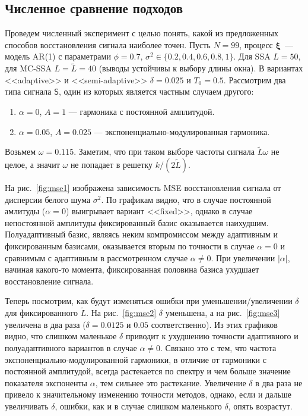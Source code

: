 \documentclass{math-mech-sci}
\begin{document}
\subsection*{Численное сравнение подходов}
Проведем численный эксперимент с целью понять, какой из предложенных способов восстановления сигнала наиболее точен. Пусть $N=99$, процесс $\bm\xi$~--- модель AR(1) с параметрами $\phi=0.7$, $\sigma^2\in\{0.2, 0.4, 0.6, 0.8, 1\}$. Для SSA $L=50$, для MC-SSA $L=\widetilde L=40$ (выводы устойчивы к выбору длины окна). В вариантах <<adaptive>> и <<semi-adaptive>> $\delta=0.025$ и $T_0=0.5$. Рассмотрим два типа сигнала $\mathsf{S}$, один из которых является частным случаем другого:
\begin{enumerate}
    \item $\alpha=0$, $A=1$ --- гармоника с постоянной амплитудой.
    \item $\alpha=0.05$, $A=0.025$ --- экспоненциально-модулированная гармоника.
\end{enumerate}
Возьмем $\omega=0.115$. Заметим, что при таком выборе частоты сигнала $\widetilde L \omega$ не целое, а значит $\omega$ не попадает в решетку $k/(2\widetilde L)$.

На рис.~\ref{fig:mse1} изображена зависимость MSE восстановления сигнала от дисперсии белого шума $\sigma^2$. По графикам видно, что в случае постоянной амлитуды ($\alpha=0$) выигрывает вариант <<fixed>>, однако в случае непостоянной амплитуды фиксированный базис оказывается наихудшим. Полуадаптивный базис, являясь неким компромиссом между адаптивным и фиксированным базисами, оказывается вторым по точности в случае $\alpha=0$ и сравнимым с адаптивным в рассмотренном случае $\alpha\ne0$. При увеличении $|\alpha|$, начиная какого-то момента, фиксированная половина базиса ухудшает восстановление сигнала.

Теперь посмотрим, как будут изменяться ошибки при уменьшении/увеличении $\delta$ для фиксированного $\widetilde L$. На рис.~\ref{fig:mse2} $\delta$ уменьшена, а на рис.~\ref{fig:mse3} увеличена в два раза ($\delta=0.0125$ и $0.05$ соответственно). Из этих графиков видно, что слишком маленькое $\delta$ приводит к ухудшению точности адаптивного и полуадаптивного вариантов в случае $\alpha\ne0$. Связано это с тем, что частота экспоненциально-модулированной гармоники, в отличие от гармоники с постоянной амплитудой, всегда растекается по спектру и чем больше значение показателя экспоненты $\alpha$, тем сильнее это растекание. Увеличение $\delta$ в два раза не привело к значительному изменению точности методов, однако, если и дальше увеличивать $\delta$, ошибки, как и в случае слишком маленького $\delta$, опять возрастут.
\end{document}
